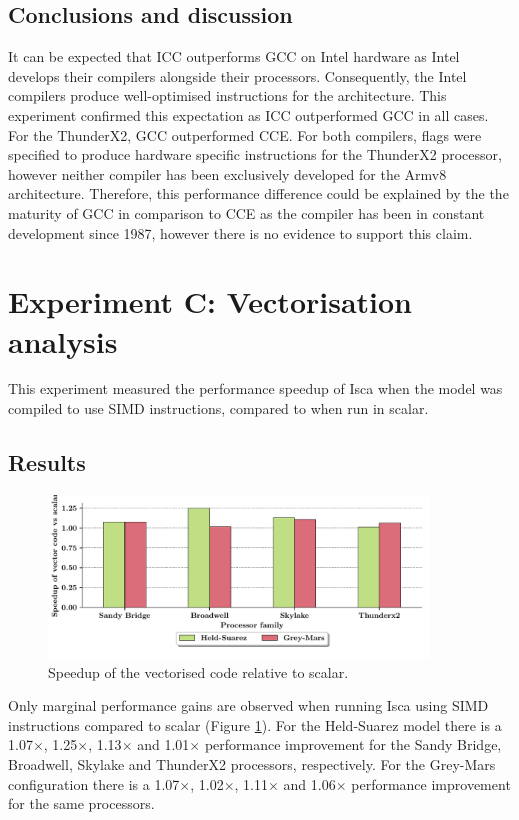 \documentclass[a4paper,11pt]{report}
\begin{document}
\subsection{Conclusions and discussion}
It can be expected that ICC outperforms GCC on Intel hardware as Intel develops their compilers alongside their processors. Consequently, the Intel compilers produce well-optimised instructions for the architecture. This experiment confirmed this expectation as ICC outperformed GCC in all cases. For the ThunderX2, GCC outperformed CCE. For both compilers, flags were specified to produce hardware specific instructions for the ThunderX2 processor, however neither compiler has been exclusively developed for the Armv8 architecture. Therefore, this performance difference could be explained by the the maturity of GCC in comparison to CCE as the compiler has been in constant development since 1987, however there is no evidence to support this claim. 


\section{Experiment C: Vectorisation analysis}
This experiment measured the performance speedup of Isca when the model was compiled to use SIMD instructions, compared to when run in scalar.
\subsection{Results}
\begin{figure}[htbp]
\begin{center}
\includegraphics[width=0.9\textwidth]{img/speedup-vector.pdf}
\caption{Speedup of the vectorised code relative to scalar. }
\label{fig:vector-gains}
\end{center}
\end{figure}
\par
Only marginal performance gains are observed when running Isca using SIMD instructions compared to scalar (Figure \ref{fig:vector-gains}). For the Held-Suarez model there is a 1.07$\times$, 1.25$\times$, 1.13$\times$ and 1.01$\times$ performance improvement for the Sandy Bridge, Broadwell, Skylake and ThunderX2 processors, respectively. For the Grey-Mars configuration there is a 1.07$\times$, 1.02$\times$, 1.11$\times$ and 1.06$\times$ performance improvement for the same processors.
\end{document}
